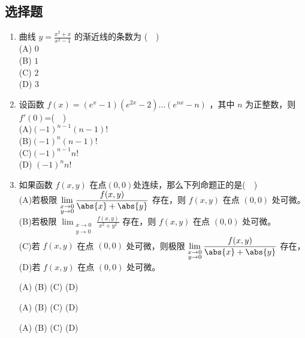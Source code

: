 \subsection{选择题}
\begin{enumerate}
\item 曲线 $\displaystyle y=\frac{x^2+x}{x^2-1}$ 的渐近线的条数为 ($\quad$)\\
(A) $0$\\
(B) $1$\\
(C) $2$\\
(D) $3$
\item 设函数 $f(x)=(e^x-1)(e^{2x}-2)\dots(e^{nx}-n)$ ，其中 $n$ 为正整数，则 $f'(0)$=($\quad$)\\
(A)$(-1)^{n-1}(n-1)!$\\
(B)$(-1)^n(n-1)!$\\
(C)$(-1)^{n-1}n!$\\
(D) $(-1)^n n!$
\item 如果函数 $f(x,y)$ 在点$ (0,0) $处连续，那么下列命题正的是($\quad$)\\
(A)若极限 $\displaystyle \lim_{\substack {x\to0 \\ y\to 0}}\frac{f(x,y)}{\abs{x}+\abs{y}}$ 存在，则 $f(x,y)$ 在点  $(0,0)$ 处可微。\\
(B)若极限 $\displaystyle \lim_{\substack {x\to0 \\ y\to 0}}\frac{f(x,y)}{x^2+y^2}$ 存在，则 $f(x,y)$ 在点  $(0,0)$ 处可微。\\
(C)若 $f(x,y)$ 在点  $(0,0)$ 处可微，则极限 $\displaystyle \lim_{\substack {x\to0 \\ y\to 0}}\frac{f(x,y)}{\abs{x}+\abs{y}}$ 存在，\\
(D)若 $f(x,y)$ 在点  $(0,0)$ 处可微。


(A)
(B)
(C)
(D)


(A)
(B)
(C)
(D)

(A)
(B)
(C)
(D)
\end{enumerate}

